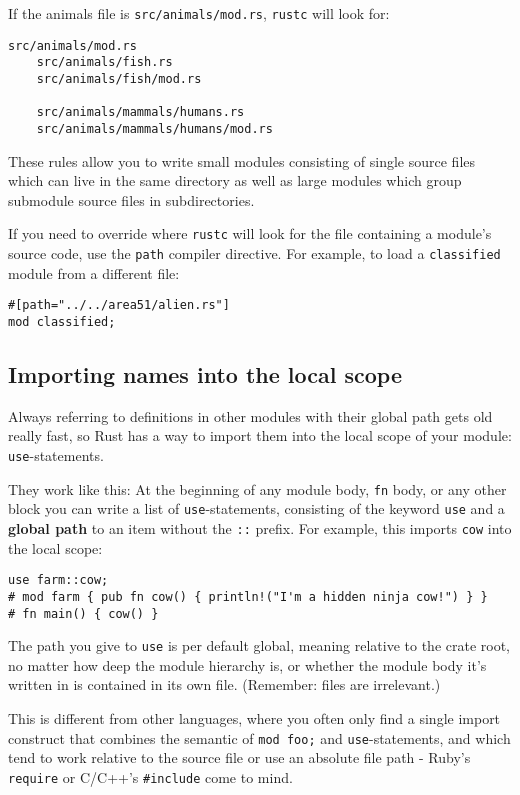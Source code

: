 \documentclass[]{article}
\begin{document}
If the animals file is \texttt{src/animals/mod.rs}, \texttt{rustc} will
look for:

\begin{verbatim}
src/animals/mod.rs
    src/animals/fish.rs
    src/animals/fish/mod.rs

    src/animals/mammals/humans.rs
    src/animals/mammals/humans/mod.rs
\end{verbatim}

These rules allow you to write small modules consisting of single source
files which can live in the same directory as well as large modules
which group submodule source files in subdirectories.

If you need to override where \texttt{rustc} will look for the file
containing a module's source code, use the \texttt{path} compiler
directive. For example, to load a \texttt{classified} module from a
different file:

\begin{verbatim}
#[path="../../area51/alien.rs"]
mod classified;
\end{verbatim}

\subsection{Importing names into the local
scope}\label{importing-names-into-the-local-scope}

Always referring to definitions in other modules with their global path
gets old really fast, so Rust has a way to import them into the local
scope of your module: \texttt{use}-statements.

They work like this: At the beginning of any module body, \texttt{fn}
body, or any other block you can write a list of
\texttt{use}-statements, consisting of the keyword \texttt{use} and a
\textbf{global path} to an item without the \texttt{::} prefix. For
example, this imports \texttt{cow} into the local scope:

\begin{verbatim}
use farm::cow;
# mod farm { pub fn cow() { println!("I'm a hidden ninja cow!") } }
# fn main() { cow() }
\end{verbatim}

The path you give to \texttt{use} is per default global, meaning
relative to the crate root, no matter how deep the module hierarchy is,
or whether the module body it's written in is contained in its own file.
(Remember: files are irrelevant.)

This is different from other languages, where you often only find a
single import construct that combines the semantic of \texttt{mod foo;}
and \texttt{use}-statements, and which tend to work relative to the
source file or use an absolute file path - Ruby's \texttt{require} or
C/C++'s \texttt{\#include} come to mind.
\end{document}
